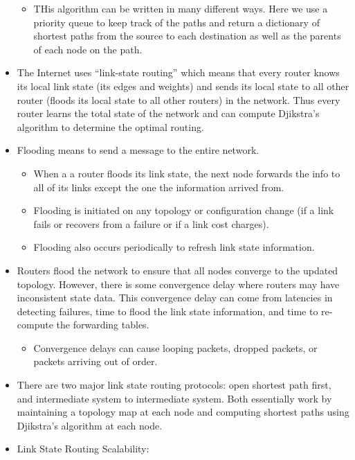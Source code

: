 \documentclass[]{article}
\providecommand{\tightlist}{%
  \setlength{\itemsep}{0pt}\setlength{\parskip}{0pt}}
\begin{document}
\begin{itemize}
  \begin{itemize}
  \tightlist
  \item
    THis algorithm can be written in many different ways. Here we use a
    priority queue to keep track of the paths and return a dictionary of
    shortest paths from the source to each destination as well as the
    parents of each node on the path.
  \end{itemize}
\item
  The Internet uses ``link-state routing'' which means that every router
  knows its local link state (its edges and weights) and sends its local
  state to all other router (floods its local state to all other
  routers) in the network. Thus every router learns the total state of
  the network and can compute Djikstra's algorithm to determine the
  optimal routing.
\item
  Flooding means to send a message to the entire network.

  \begin{itemize}
  \tightlist
  \item
    When a a router floods its link state, the next node forwards the
    info to all of its links except the one the information arrived
    from.
  \item
    Flooding is initiated on any topology or configuration change (if a
    link fails or recovers from a failure or if a link cost charges).
  \item
    Flooding also occurs periodically to refresh link state information.
  \end{itemize}
\item
  Routers flood the network to ensure that all nodes converge to the
  updated topology. However, there is some convergence delay where
  routers may have inconsistent state data. This convergence delay can
  come from latencies in detecting failures, time to flood the link
  state information, and time to re-compute the forwarding tables.

  \begin{itemize}
  \tightlist
  \item
    Convergence delays can cause looping packets, dropped packets, or
    packets arriving out of order.
  \end{itemize}
\item
  There are two major link state routing protocols: open shortest path
  first, and intermediate system to intermediate system. Both
  essentially work by maintaining a topology map at each node and
  computing shortest paths using Djikstra's algorithm at each node.
\item
  Link State Routing Scalability:


\end{itemize}
\end{document}

